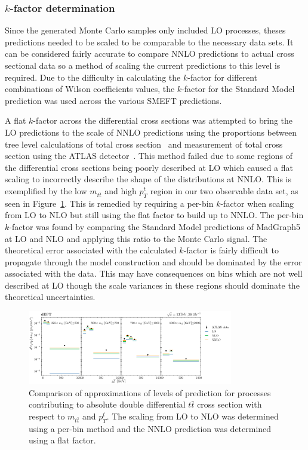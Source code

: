 \documentclass[a4paper]{article}
\begin{document}
\subsubsection{\texorpdfstring{$k$}{k}-factor determination}
Since the generated Monte Carlo samples only included LO processes, theses predictions needed to be scaled to be comparable to the necessary data sets.
It can be considered fairly accurate to compare NNLO predictions to actual cross sectional data so a method of scaling the current predictions to this level is required.
Due to the difficulty in calculating the $k$-factor for different combinations of Wilson coefficients values, the $k$-factor for the Standard Model prediction was used across the various SMEFT predictions.

A flat $k$-factor across the differential cross sections was attempted to bring the LO predictions to the scale of NNLO predictions using the proportions between tree level calculations of total cross section~\cite{Alwall_2014} and measurement of total cross section using the ATLAS detector~\cite{ATLAS:2019hxz}.
This method failed due to some regions of the differential cross sections being poorly described at LO which caused a flat scaling to incorrectly describe the shape of the distributions at NNLO.
This is exemplified by the low $m_{t\bar{t}}$ and high $p_{T}^{t}$ region in our two observable data set, as seen in Figure~\ref{fig:kfactor}.
This is remedied by requiring a per-bin $k$-factor when scaling from LO to NLO but still using the flat factor to build up to NNLO.
The per-bin $k$-factor was found by comparing the Standard Model predictions of MadGraph5 at LO and NLO and applying this ratio to the Monte Carlo signal.
The theoretical error associated with the calculated $k$-factor is fairly difficult to propagate through the model construction and should be dominated by the error associated with the data.
This may have consequences on bins which are not well described at LO though the scale variances in these regions should dominate the theoretical uncertainties.

\begin{figure}
    \centering
    \includegraphics[width=0.8\textwidth]{plots/k_factor.png}
    \caption{Comparison of approximations of levels of prediction for processes contributing to absolute double differential $t\bar{t}$ cross section with respect to $m_{t\bar{t}}$ and $p_{T}^{t}$. The scaling from LO to NLO was determined using a per-bin method and the NNLO prediction was determined using a flat factor.}
    \label{fig:kfactor}
\end{figure}
\end{document}
